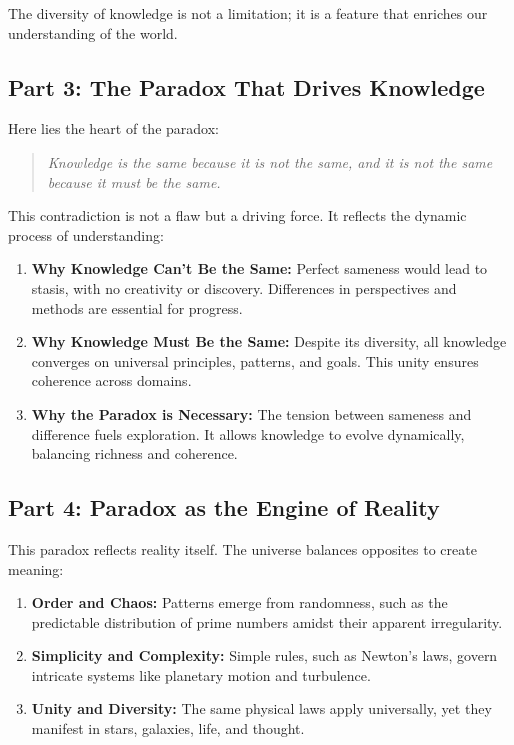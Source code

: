 \documentclass[12pt]{article}
\begin{document}
The diversity of knowledge is not a limitation; it is a feature that enriches our understanding of the world.

\subsection*{Part 3: The Paradox That Drives Knowledge}
Here lies the heart of the paradox:
\begin{quote}
\textit{Knowledge is the same because it is not the same, and it is not the same because it must be the same.}
\end{quote}
This contradiction is not a flaw but a driving force. It reflects the dynamic process of understanding:
\begin{enumerate}
    \item \textbf{Why Knowledge Can't Be the Same:} Perfect sameness would lead to stasis, with no creativity or discovery. Differences in perspectives and methods are essential for progress.
    
    \item \textbf{Why Knowledge Must Be the Same:} Despite its diversity, all knowledge converges on universal principles, patterns, and goals. This unity ensures coherence across domains.
    
    \item \textbf{Why the Paradox is Necessary:} The tension between sameness and difference fuels exploration. It allows knowledge to evolve dynamically, balancing richness and coherence.
\end{enumerate}

\subsection*{Part 4: Paradox as the Engine of Reality}
This paradox reflects reality itself. The universe balances opposites to create meaning:
\begin{enumerate}
    \item \textbf{Order and Chaos:} Patterns emerge from randomness, such as the predictable distribution of prime numbers amidst their apparent irregularity.
    
    \item \textbf{Simplicity and Complexity:} Simple rules, such as Newton's laws, govern intricate systems like planetary motion and turbulence.
    
    \item \textbf{Unity and Diversity:} The same physical laws apply universally, yet they manifest in stars, galaxies, life, and thought.
\end{enumerate}
\end{document}
